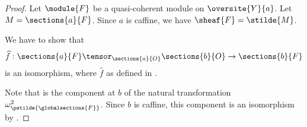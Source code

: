 
\begin{proof}
Let $\module{F}$ be a quasi-coherent module on $\oversite{Y}{a}$.
Let $M = \sections{a}{F}$.
Since $a$ is caffine, we have $\sheaf{F} = \stilde{M}$.

We have to show that
\[\widehat{f}:\sections{a}{F} \tensor_{\sections{a}{O}} \sections{b}{O} \rightarrow \sections{b}{F}\]
is an isomorphism, where $\widehat{f}$ as defined in .

Note that  is the component at $b$ of the natural transformation $\omega^2_{\pstilde{\globalsections{F}}}$.
Since $b$ is caffine, this component is an isomorphism by .
\end{proof}